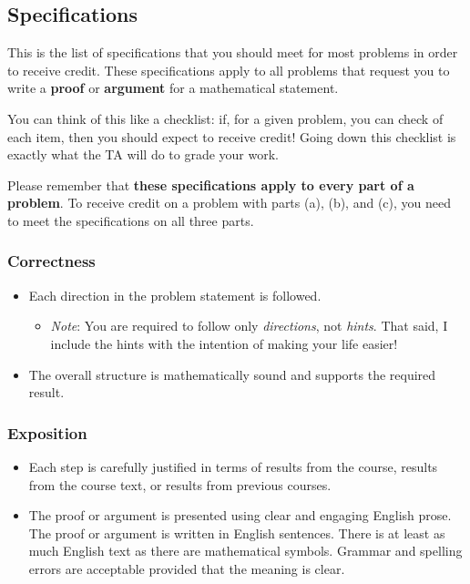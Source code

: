 \documentclass{hw}
\begin{document}
\pagebreak

\subsection*{Specifications}

This is the list of specifications that you should meet for most problems in order to receive credit. 
These specifications apply to all problems that request you to write a \textbf{proof} or \textbf{argument} for a mathematical statement. 

You can think of this like a checklist: if, for a given problem, you can check of each item, then you should expect to receive credit! 
Going down this checklist is exactly what the TA will do to grade your work. 

Please remember that \textbf{these specifications apply to every part of a problem}. 
To receive credit on a problem with parts (a), (b), and (c), you need to meet the specifications on all three parts.  

\subsubsection*{Correctness}

\begin{itemize}
    \item Each direction in the problem statement is followed. 
    \begin{itemize}
        \item \emph{Note}: You are required to follow only \emph{directions}, not \emph{hints}. 
        That said, I include the hints with the intention of making your life easier! 
    \end{itemize}
    \item The overall structure is mathematically sound and supports the required result. 
\end{itemize}

\subsubsection*{Exposition}

\begin{itemize}
    \item Each step is carefully justified in terms of results from the course, results from the course text, or results from previous courses. 
    \item The proof or argument is presented using clear and engaging English prose. 
    The proof or argument is written in English sentences. 
    There is at least as much English text as there are mathematical symbols. 
    Grammar and spelling errors are acceptable provided that the meaning is clear. 
\end{itemize}
\end{document}
